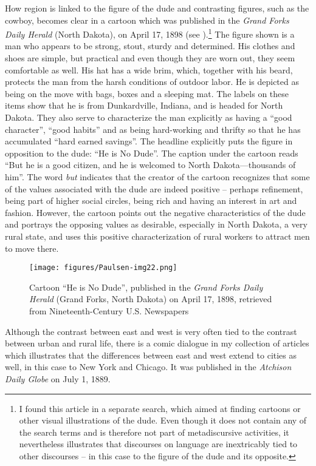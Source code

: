 How region is linked to the figure of the dude and contrasting figures, such as the cowboy, becomes clear in a cartoon which was published in the \emph{Grand Forks Daily Herald} (North Dakota), on April 17, 1898 (see ).\footnote{I found this article in a separate search, which aimed at finding cartoons or other visual illustrations of the dude. Even though it does not contain any of the search terms and is therefore not part of metadiscursive activities, it nevertheless illustrates that discourses on language are inextricably tied to other discourses – in this case to the figure of the dude and its opposite.} The figure shown is a man who appears to be strong, stout, sturdy and determined. His clothes and shoes are simple, but practical and even though they are worn out, they seem comfortable as well. His hat has a wide brim, which, together with his beard, protects the man from the harsh conditions of outdoor labor. He is depicted as being on the move with bags, boxes and a sleeping mat. The labels on these items show that he is from Dunkardville, Indiana, and is headed for North Dakota. They also serve to characterize the man explicitly as having a “good character”, “good habits” and as being hard-working and thrifty so that he has accumulated “hard earned savings”. The headline explicitly puts the figure in opposition to the dude: “He is No Dude”. The caption under the cartoon reads “But he is a good citizen, and he is welcomed to North Dakota—thousands of him”. The word \emph{but} indicates that the creator of the cartoon recognizes that some of the values associated with the dude are indeed positive – perhaps refinement, being part of higher social circles, being rich and having an interest in art and fashion. However, the cartoon points out the negative characteristics of the dude and portrays the opposing values as desirable, especially in North Dakota, a very rural state, and uses this positive characterization of rural workers to attract men to move there.


\begin{figure}
\texttt{[image: figures/Paulsen-img22.png]}
\caption{
Cartoon “He is No Dude”, published in the \emph{Grand Forks Daily Herald} (Grand Forks, North Dakota) on April 17, 1898, retrieved from Nineteenth-Century U.S. Newspapers
}
\label{fig:key:22}
\end{figure}

Although the contrast between east and west is very often tied to the contrast between urban and rural life, there is a comic dialogue in my collection of articles which illustrates that the differences between east and west extend to cities as well, in this case to New York and Chicago. It was published in the \emph{Atchison Daily Globe} on July 1, 1889.


